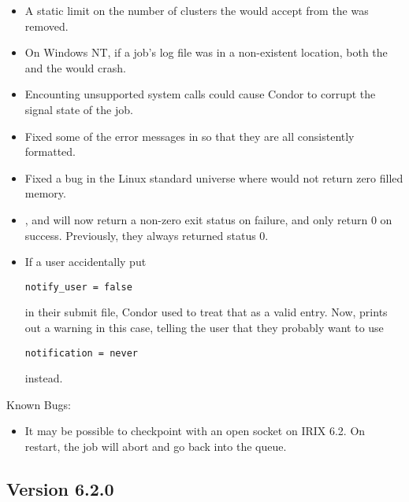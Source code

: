 \begin{itemize}
\item A static limit on the number of clusters the 
would accept from the  was removed.

\item On Windows NT, if a job's log file was in a non-existent location,
both the  and the  would crash.

\item Encounting unsupported system calls could cause Condor to corrupt the
signal state of the job. 

\item Fixed some of the error messages in  so that they
are all consistently formatted.

\item Fixed a bug in the Linux standard universe where 
would not return zero filled memory.

\item {},  and  will now return
a non-zero exit status on failure, and only return 0 on success.
Previously, they always returned status 0.

\item If a user accidentally put \begin{verbatim}notify_user = false\end{verbatim} in their submit file, Condor used to treat that
as a valid entry.
Now,  prints out a warning in this case, telling the
user that they probably want to use 
\begin{verbatim}notification = never\end{verbatim} instead.

\end{itemize}

\noindent Known Bugs:

\begin{itemize}

\item It may be possible to checkpoint with an open socket on IRIX 6.2.
On restart, the job will abort and go back into the queue. 

\end{itemize}

\subsection*{\label{sec:New-6-2-0}Version 6.2.0}


